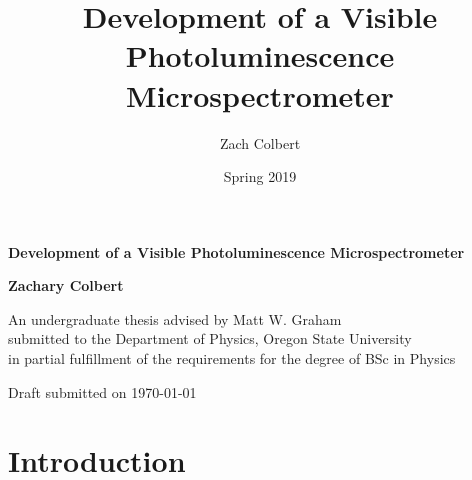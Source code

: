 \documentclass[12pt]{article}
\title{Development of a Visible Photoluminescence Microspectrometer}
\author{Zach Colbert}
\date{Spring 2019}
\renewenvironment{abstract}
 {%
  \global\setbox\abstractbox=\vtop\bgroup
  \begin{center}\bfseries\abstractname\end{center}%
 }
 {\par\egroup}
\begin{document}

  \begin{titlepage}
    \begin{center}
        \vspace*{1cm}
  
        \textbf{Development of a Visible Photoluminescence Microspectrometer}
  
        \vspace{3cm}
  
        \textbf{Zachary Colbert}
  
        \vspace{10cm}
  
        An undergraduate thesis advised by Matt W. Graham \\
        submitted to the Department of Physics, Oregon State University \\
        in partial fulfillment of the requirements for the degree of BSc in Physics
  
        \vfill
  
        Draft submitted on \today
  
    \end{center}
  \end{titlepage}

  

  \tableofcontents
  \listoffigures


  \section{Introduction}\label{chap:intro}
  

  
\end{document}
